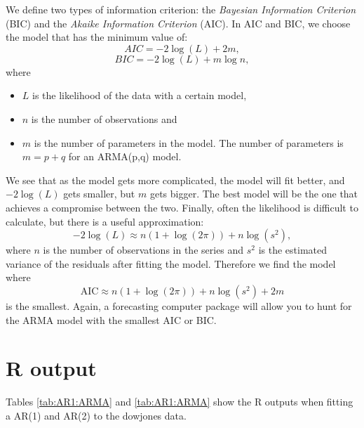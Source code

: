 \documentclass[a4paper,11pt,oneside,onecolumn]{book}
\begin{document}
\begin{definition}
 We define two types of information criterion: the \textit{Bayesian Information Criterion} (BIC) and the \textit{Akaike Information Criterion} (AIC). In AIC and BIC, we choose the model that has the minimum
value of:
\[ AIC = - 2 \log(L) + 2m, \]
\[ BIC = - 2 \log(L) + m \log n, \]
where
\begin{itemize}
\item $L$ is the likelihood of the data with a certain model, 
\item $n$ is the number of observations and
\item $m$ is the number of parameters in the model. The number of parameters is $m=p+q$ for an ARMA(p,q) model. %
\end{itemize}
\end{definition}

We see that as the model gets more complicated, the model will fit
better, and $-2 \log(L)$ gets smaller, but $m$ gets bigger. The best
model will be the one that achieves a compromise between the two.
Finally, often the likelihood is difficult to calculate, but there
is a useful approximation:
\[ - 2 \log(L) \approx n (1 + \log(2 \pi)) + n \log (s^2), \]
where $n$ is the number of observations in the series and $s^2$ is
the estimated variance of the residuals after fitting the model. Therefore we
find the model where
\[ \text{AIC} \approx n (1 + \log(2 \pi)) + n \log (s^2) + 2m \] is the smallest.
Again, a forecasting computer package will allow you to hunt for the
ARMA model with the smallest AIC or BIC.

\section{R output}
Tables \ref{tab:AR1:ARMA} and \ref{tab:AR1:ARMA}  show the R outputs when fitting a AR(1) and AR(2) to the dowjones data.
\end{document}
